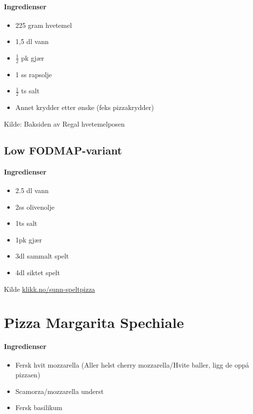 \documentclass[12pt,a4paper]{book}
\begin{document}
\paragraph{Ingredienser}
\begin{itemize}[noitemsep]
	\item 225 gram hvetemel
	\item 1,5 dl vann
	\item $\frac{1}{2}$ pk gjær
	\item 1 ss rapsolje
	\item $\frac{1}{2}$ ts salt
	\item Annet krydder etter ønske (feks pizzakrydder)
\end{itemize}



Kilde: Baksiden av Regal hvetemelposen

\subsection{Low FODMAP-variant}

\paragraph{Ingredienser}
\begin{itemize}[noitemsep]
	\item 2.5 dl vann
	\item 2ss olivenolje
	\item 1ts salt
	\item 1pk gjær
	\item 3dl sammalt spelt
	\item 4dl siktet spelt
\end{itemize}



Kilde \href{http://oppskrift.klikk.no/sunn-speltpizza/2795/f}{klikk.no/sunn-speltpizza}
\clearpage{}
\clearpage{}\section{﻿Pizza Margarita Spechiale}


\paragraph{Ingredienser}
\begin{itemize}[noitemsep]
	\item Fersk hvit mozzarella (Aller helst cherry mozzarella/Hvite baller, ligg de oppå pizzaen)
	\item Scamorza/mozzarella underst
	\item Fersk basilikum
\end{itemize}
\end{document}
